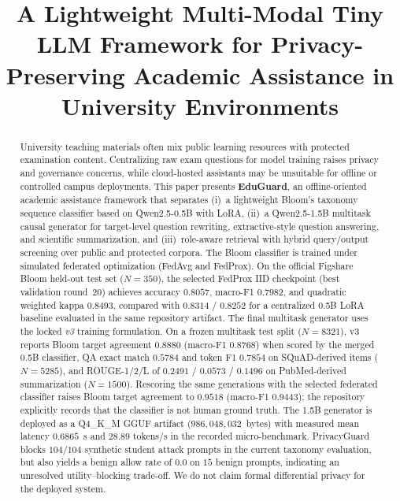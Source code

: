\documentclass[journal]{IEEEtran}
\begin{document}
\title{A Lightweight Multi-Modal Tiny LLM Framework for Privacy-Preserving Academic Assistance in University Environments}

\author{
}

\maketitle

\begin{abstract}
University teaching materials often mix public learning resources with protected examination content.
Centralizing raw exam questions for model training raises privacy and governance concerns, while cloud-hosted assistants may be unsuitable for offline or controlled campus deployments.
This paper presents \textbf{EduGuard}, an offline-oriented academic assistance framework that separates (i)~a lightweight Bloom's taxonomy sequence classifier based on Qwen2.5-0.5B with LoRA, (ii)~a Qwen2.5-1.5B multitask causal generator for target-level question rewriting, extractive-style question answering, and scientific summarization, and (iii)~role-aware retrieval with hybrid query/output screening over public and protected corpora.
The Bloom classifier is trained under simulated federated optimization (FedAvg and FedProx).
On the official Figshare Bloom held-out test set ($N{=}350$), the selected FedProx IID checkpoint (best validation round~20) achieves accuracy $0.8057$, macro-F1 $0.7982$, and quadratic weighted kappa $0.8493$, compared with $0.8314$ / $0.8252$ for a centralized 0.5B LoRA baseline evaluated in the same repository artifact.
The final multitask generator uses the locked \emph{v3} training formulation.
On a frozen multitask test split ($N{=}8321$), v3 reports Bloom target agreement $0.8880$ (macro-F1 $0.8768$) when scored by the merged 0.5B classifier, QA exact match $0.5784$ and token F1 $0.7854$ on SQuAD-derived items ($N{=}5285$), and ROUGE-1/2/L of $0.2491$ / $0.0573$ / $0.1496$ on PubMed-derived summarization ($N{=}1500$).
Rescoring the same generations with the selected federated classifier raises Bloom target agreement to $0.9518$ (macro-F1 $0.9443$); the repository explicitly records that the classifier is not human ground truth.
The 1.5B generator is deployed as a Q4\_K\_M GGUF artifact ($986{,}048{,}032$~bytes) with measured mean latency $0.6865$~s and $28.89$ tokens/s in the recorded micro-benchmark.
PrivacyGuard blocks $104/104$ synthetic student attack prompts in the current taxonomy evaluation, but also yields a benign allow rate of $0.0$ on $15$ benign prompts, indicating an unresolved utility--blocking trade-off.
We do not claim formal differential privacy for the deployed system.
\end{abstract}
\end{document}
